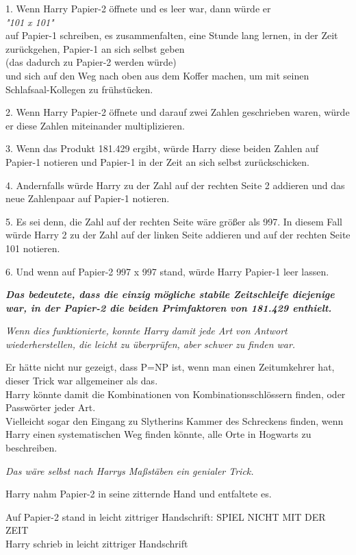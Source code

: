 {1. Wenn Harry Papier-2 öffnete und es leer war, dann würde er\\ \emph{"101 x 101"}\\ auf Papier-1 schreiben, es zusammenfalten, eine Stunde lang lernen, in der Zeit zurückgehen, Papier-1 an sich selbst geben\\ (das dadurch zu Papier-2 werden würde)\\ und sich auf den Weg nach oben aus dem Koffer machen, um mit seinen Schlafsaal-Kollegen zu frühstücken.

2. Wenn Harry Papier-2 öffnete und darauf zwei Zahlen geschrieben waren, würde er diese Zahlen miteinander multiplizieren.

3. Wenn das Produkt 181.429 ergibt, würde Harry diese beiden Zahlen auf Papier-1 notieren und Papier-1 in der Zeit an sich selbst zurückschicken.

4. Andernfalls würde Harry zu der Zahl auf der rechten Seite 2 addieren und das neue Zahlenpaar auf Papier-1 notieren.

5. Es sei denn, die Zahl auf der rechten Seite wäre größer als 997. In diesem Fall würde Harry 2 zu der Zahl auf der linken Seite addieren und auf der rechten Seite 101 notieren.

6. Und wenn auf Papier-2 997 x 997 stand, würde Harry Papier-1 leer lassen.

\textbf{\emph{Das bedeutete, dass die einzig mögliche stabile Zeitschleife diejenige war, in der Papier-2 die beiden Primfaktoren von 181.429 enthielt.}}

\emph{Wenn dies funktionierte, konnte Harry damit jede Art von Antwort wiederherstellen, die leicht zu überprüfen, aber schwer zu finden war.}

Er hätte nicht nur gezeigt, dass P=NP ist, wenn man einen Zeitumkehrer hat, dieser Trick war allgemeiner als das.\\ Harry könnte damit die Kombinationen von Kombinationsschlössern finden, oder Passwörter jeder Art.\\ Vielleicht sogar den Eingang zu Slytherins Kammer des Schreckens finden, wenn Harry einen systematischen Weg finden könnte, alle Orte in Hogwarts zu beschreiben.

\emph{Das wäre selbst nach Harrys Maßstäben ein genialer Trick.}

Harry nahm Papier-2 in seine zitternde Hand und entfaltete es.

Auf Papier-2 stand in leicht zittriger Handschrift: SPIEL NICHT MIT DER ZEIT\\ Harry schrieb in leicht zittriger Handschrift

}
